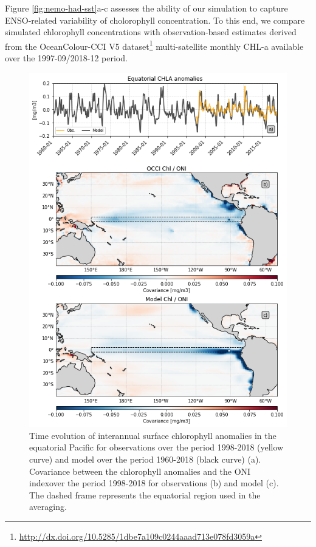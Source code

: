 Figure \ref{fig:nemo-had-sst}a-c assesses the ability of our simulation to capture ENSO-related variability of cholorophyll concentration. To this end, we compare simulated chlorophyll concentrations with observation-based estimates derived from the  OceanColour-CCI V5  dataset\footnote{\url{http://dx.doi.org/10.5285/1dbe7a109c0244aaad713e078fd3059a}} \citep{sathyendranathOceanColourTimeSeries2019} multi-satellite monthly CHL-a available over the 1997-09/2018-12 period. 

\begin{figure}[h!tp]
	\centering
	\includegraphics[scale=0.4]{figs/fig2.png}
	\caption{Time evolution of interannual surface chlorophyll anomalies in the equatorial Pacific for observations over the period 1998-2018 (yellow curve) and  model over the period 1960-2018 (black curve) (a). Covariance between the chlorophyll anomalies and the ONI indexover the period 1998-2018 for observations (b) and model (c). The dashed frame represents the equatorial region used in the averaging.}
	\label{fig:nemo-sat-chl}
\end{figure}

